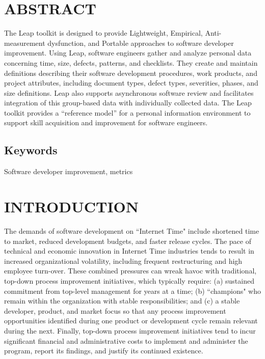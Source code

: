 

\section*{ABSTRACT}

The Leap toolkit is designed to provide Lightweight, Empirical,
Anti-measurement dysfunction, and Portable approaches to
software developer improvement. Using Leap, software engineers gather and
analyze personal data concerning time, size, defects, patterns, and
checklists. They create and maintain definitions describing their software
development procedures, work products, and project attributes, including
document types, defect types, severities, phases, and size definitions.
Leap also supports asynchronous software review and facilitates integration
of this group-based data with individually collected data.  The Leap
toolkit provides a ``reference model'' for a personal information
environment to support skill acquisition and improvement for software
engineers.

\subsection{Keywords}
Software developer improvement, metrics

\section{INTRODUCTION}

The demands of software development on ``Internet Time" include shortened
time to market, reduced development budgets, and faster release cycles.
The pace of technical and economic innovation in Internet Time industries
tends to result in increased organizational volatility, including frequent
restructuring and high employee turn-over.  These combined pressures can
wreak havoc with traditional, top-down process improvement initiatives,
which typically require: (a) sustained commitment from top-level management
for years at a time; (b) ``champions" who remain within the organization
with stable responsibilities; and (c) a stable developer, product, and
market focus so that any process improvement opportunities identified
during one product or development cycle remain relevant during the next.
Finally, top-down process improvement initiatives tend to incur significant
financial and administrative costs to implement and administer the program, report its
findings, and justify its continued existence.



